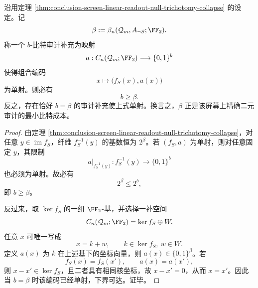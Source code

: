 \begin{theorem}[精确二元审计的同调比特下界]\label{thm:conclusion-screen-exact-binary-audit-homological-bit-bound}
沿用定理 \ref{thm:conclusion-screen-linear-readout-null-trichotomy-collapse} 的设定。记
\[
\beta:=\beta_n(\mathcal Q_m,A_{\neg S};\FF_2).
\]
称一个 \(b\)-比特审计补充为映射
\[
a:C_n(\mathcal Q_m;\FF_2)\longrightarrow \{0,1\}^b
\]
使得组合编码
\[
x\longmapsto \bigl(f_S(x),a(x)\bigr)
\]
为单射。则必有
\[
b\ge \beta.
\]
反之，存在恰好 \(b=\beta\) 的审计补充使上式单射。换言之，\(\beta\) 正是该屏幕上精确二元审计的最小比特成本。
\end{theorem}

\begin{proof}
由定理 \ref{thm:conclusion-screen-linear-readout-null-trichotomy-collapse}，对任意 \(y\in \operatorname{im}f_S\)，纤维 \(f_S^{-1}(y)\) 的基数恒为 \(2^\beta\)。若 \((f_S,a)\) 为单射，则对任意固定 \(y\)，其限制
\[
a|_{f_S^{-1}(y)}:f_S^{-1}(y)\to \{0,1\}^b
\]
也必须为单射。故必有
\[
2^\beta\le 2^b,
\]
即 \(b\ge \beta\)。

反过来，取 \(\ker f_S\) 的一组 \(\FF_2\)-基，并选择一补空间
\[
C_n(\mathcal Q_m;\FF_2)=\ker f_S\oplus W.
\]
任意 \(x\) 可唯一写成
\[
x=k+w,
\qquad
k\in \ker f_S,\ w\in W.
\]
定义 \(a(x)\) 为 \(k\) 在上述基下的坐标向量，则 \(a(x)\in \{0,1\}^{\beta}\)。若
\[
f_S(x)=f_S(x'),
\qquad
a(x)=a(x'),
\]
则 \(x-x'\in \ker f_S\)，且二者具有相同核坐标，故 \(x-x'=0\)，从而 \(x=x'\)。因此当 \(b=\beta\) 时该编码已经单射，下界可达。证毕。
\end{proof}

\endinput
